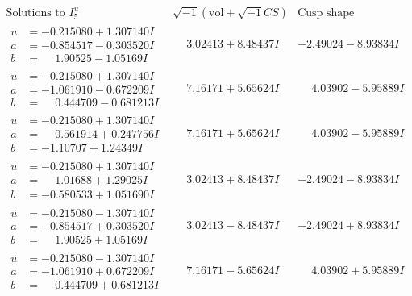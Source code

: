 \documentclass[1p]{elsarticle_modified}
\theoremstyle{definition}
\newcommand{\I}{\sqrt{-1}}
\begin{document}
$$\begin{array}{c|c|c}  
\text{Solutions to }I^u_{5}& \I (\text{vol} + \sqrt{-1}CS) & \text{Cusp shape}\\
 \hline 
\begin{aligned}
u &= -0.215080 + 1.307140 I \\
a &= -0.854517 - 0.303520 I \\
b &= \phantom{-}1.90525 - 1.05169 I\end{aligned}
 & \phantom{-}3.02413 + 8.48437 I & -2.49024 - 8.93834 I \\ \hline\begin{aligned}
u &= -0.215080 + 1.307140 I \\
a &= -1.061910 - 0.672209 I \\
b &= \phantom{-}0.444709 - 0.681213 I\end{aligned}
 & \phantom{-}7.16171 + 5.65624 I & \phantom{-}4.03902 - 5.95889 I \\ \hline\begin{aligned}
u &= -0.215080 + 1.307140 I \\
a &= \phantom{-}0.561914 + 0.247756 I \\
b &= -1.10707 + 1.24349 I\end{aligned}
 & \phantom{-}7.16171 + 5.65624 I & \phantom{-}4.03902 - 5.95889 I \\ \hline\begin{aligned}
u &= -0.215080 + 1.307140 I \\
a &= \phantom{-}1.01688 + 1.29025 I \\
b &= -0.580533 + 1.051690 I\end{aligned}
 & \phantom{-}3.02413 + 8.48437 I & -2.49024 - 8.93834 I \\ \hline\begin{aligned}
u &= -0.215080 - 1.307140 I \\
a &= -0.854517 + 0.303520 I \\
b &= \phantom{-}1.90525 + 1.05169 I\end{aligned}
 & \phantom{-}3.02413 - 8.48437 I & -2.49024 + 8.93834 I \\ \hline\begin{aligned}
u &= -0.215080 - 1.307140 I \\
a &= -1.061910 + 0.672209 I \\
b &= \phantom{-}0.444709 + 0.681213 I\end{aligned}
 & \phantom{-}7.16171 - 5.65624 I & \phantom{-}4.03902 + 5.95889 I \\ \hline\begin{aligned}

\end{aligned}
\end{array}$$
\end{document}

